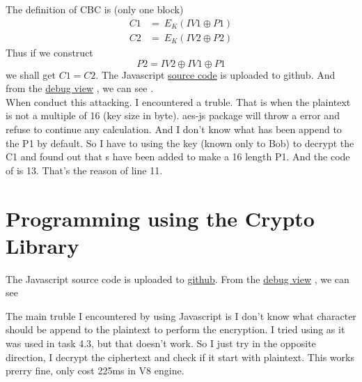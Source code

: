 \documentclass{article}
\begin{document}
\subsection{}
The definition of CBC is (only one block)
$$
	\begin{aligned}
		C1 & =\ E_K(IV1\oplus P1) \\
		C2 & =\ E_K(IV2\oplus P2)
	\end{aligned}
$$
Thus if we construct
$$P2 = IV2 \oplus IV1 \oplus P1$$
we shall get $C1 = C2$. The Javascript
\href{https://github.com/Luna1996/WUSTL/blob/master/571/L2/task43.js}{source code}
is uploaded to github. And from the
\href{https://i.loli.net/2018/09/25/5ba9d18306d92.png}{debug view}
, we can see .\\
When conduct this attacking. I encountered a truble. That is when the plaintext is not a multiple of 16 (key size in byte). aes-js package will throw a error and refuse to continue any calculation. And I don't know what has been append to the P1 by default. So I have to using the key (known only to Bob) to decrypt the C1 and found out that s have been added to make a 16 length P1. And the code of  is 13. That's the reason of line 11.

\section{Programming using the Crypto Library}
The Javascript source code is uploaded to
\href{https://github.com/Luna1996/WUSTL/blob/master/571/L2/task5.js}{github}. From the
\href{https://i.loli.net/2018/09/25/5ba9dc456b4f4.png}{debug view}
, we can see
\begin{center}
\end{center}
The main truble I encountered by using Javascript is I don't know what character should be append to the plaintext to perform the encryption. I tried using  as it was used in task 4.3, but that doesn't work. So I just try in the opposite direction, I decrypt the ciphertext and check if it start with plaintext. This works prerry fine, only cost 225ms in V8 engine.
\end{document}
